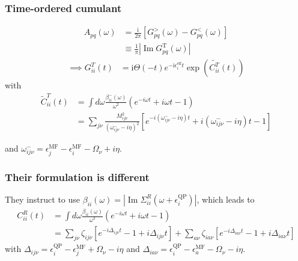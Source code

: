 \begin{frame}
    \frametitle{Time-ordered cumulant}
\begin{align}
A_{p q}(\omega) & =\frac{\mathrm{i}}{2 \pi}\left[G_{p q}^{>}(\omega)-G_{p q}^{<}(\omega)\right] \\
& \equiv \frac{1}{\pi}\left|\operatorname{Im} G_{p q}^{\mathrm{T}}(\omega)\right|
\end{align}\pause\begin{align}
\implies
G_{ii}^{T}(t)&=\mathrm{i}\Theta(-t)e^{-\mathrm{i} \epsilon_i^{\text{eff}} t}\exp\left(\tilde{C^T_{ii}}(t)\right)
\end{align}\pause
with
\begin{align}
    \tilde{C}_{ii}^T(t)&=\int d \omega \frac{\beta_{ii}^{-}(\omega)}{\omega^2}\left(e^{-i \omega t}+i \omega t-1\right)\\
&
=
\sum_{j\nu}
\frac{
M_{ij\nu}^2
}{
\left(\omega_{ij\nu}^{-}-i\eta\right)^2
}
\left[
e^{-i(\omega_{ij\nu}^{-}-i\eta)t}
+
i(\omega_{ij\nu}^{-}-i\eta)t
-
1
\right]
\end{align}

and $\omega_{ij\nu}^{-}= \epsilon_j^{\mathrm{MF}} - \epsilon_i^{\text{MF}} - \Omega_\nu+i\eta$.

\end{frame}
\begin{frame}
    \frametitle{Their formulation is different}
They instruct to use $\beta_{ii}(\omega) = \left|\operatorname{Im} \Sigma_{ii}^R\left(\omega+\epsilon_i^{\text{QP}}\right)\right|$, \pause which leads to
\begin{align}
    C_{ii}^R(t)&=\int d \omega \frac{\beta_{ii}(\omega)}{\omega^2}\left(e^{-i \omega t}+i \omega t-1\right)\\
&= \sum_{j\nu} \zeta_{ij\nu} \left[ e^{-i\Delta_{ij\nu} t} - 1 + i\Delta_{ij\nu} t \right] + \sum_{a\nu} \zeta_{ia\nu} \left[ e^{-i\Delta_{ia\nu} t} - 1 + i\Delta_{ia\nu} t \right]
\label{eq:Cpp_2}
\end{align}
with $\Delta_{ij\nu} = \epsilon_i^{\text{QP}} - \epsilon_j^{\text{MF}} + \Omega_\nu - i\eta$ and $\Delta_{ia\nu} = \epsilon_i^{\text{QP}} - \epsilon_a^{\text{MF}} - \Omega_\nu - i\eta$.
\end{frame}
